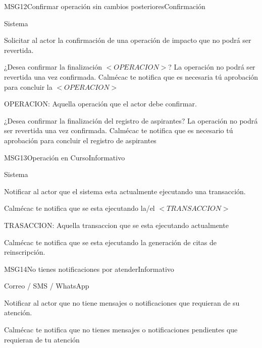 \begin{mensaje}{MSG12}{Confirmar operación sin cambios posteriores}{Confirmación}
	\item[Canal:] Sistema
	\item[Propósito:] Solicitar al actor la confirmación de una operación de impacto que no podrá ser revertida.
	\item[Redacción:] ¿Desea confirmar la finalización $<OPERACION>$? La operación no podrá ser revertida una vez confirmada.
	Calmécac te notifica que es necesaria tú aprobación para concluir la $<OPERACION>$
	\item[Parámetros:] OPERACION: Aquella operación que el actor debe confirmar.
	\item[Ejemplo:] ¿Desea confirmar la finalización del registro de aspirantes? La operación no podrá ser revertida una vez confirmada.
	Calmécac te notifica que es necesario tú aprobación para concluir el registro de aspirantes
	\item[Referenciado por: ] 
\end{mensaje}

\begin{mensaje}{MSG13}{Operación en Curso}{Informativo}
	\item[Canal:] Sistema
	\item[Propósito:] Notificar al actor que el sistema esta actualmente ejecutando una transacción.
	\item[Redacción:] Calmécac te notifica que se esta ejecutando la/el $<TRANSACCION>$
	\item[Parámetros:] TRASACCION: Aquella transaccion que se esta ejecutando actualmente
	\item[Ejemplo:] Calmécac te notifica que se esta ejecutando la generación de citas de reinscripción.
	\item[Referenciado por: ]     
\end{mensaje}


\begin{mensaje}{MSG14}{No tienes notificaciones por atender}{Informativo}
	\item[Canal:] Correo / SMS / WhatsApp
	\item[Propósito:] Notificar al actor que no tiene mensajes o notificaciones que requieran de su atención.
	\item[Redacción:] Calmécac te notifica que no tienes mensajes o notificaciones pendientes que requieran de tu atención
\end{mensaje}

